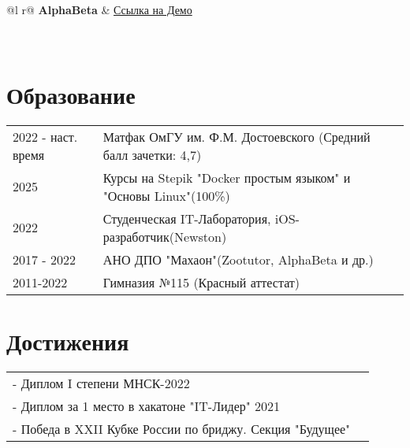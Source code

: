 \documentclass[a4paper,12pt]{article}
\begin{document}
\begin{tabularx}{\linewidth}{ @{}l r@{} }
{\textbf{AlphaBeta}} & \hfill \href{https://github.com/KuznetsLex/AlphaBeta}{Ссылка на Демо} \\[3.75pt]
 \\\\

\end{tabularx}

\section{Образование}
\begin{tabularx}{\linewidth}{@{}l X@{}}	
2022 - наст. время & Матфак ОмГУ им. Ф.М. Достоевского \hfill \normalsize (Средний балл зачетки: 4,7) \\
2025 & Курсы на Stepik "Docker простым языком" и "Основы Linux"\hfill (100\%)\\
2022 & Студенческая IT-Лаборатория, iOS-разработчик\hfill (Newston)\\
2017 - 2022 & АНО ДПО "Махаон"\hfill(Zootutor, AlphaBeta и др.) \\ 
2011-2022 & Гимназия №115 \hfill  (Красный аттестат) \\
\end{tabularx}

\section{Достижения}
\begin{tabularx}{\linewidth}{@{}l X@{}}	
- Диплом I степени МНСК-2022 \hfill \normalsize  \\
- Диплом за 1 место в хакатоне "IT-Лидер" 2021\\
- Победа в XXII Кубке России по бриджу. Секция "Будущее" \hfill  \\
\end{tabularx}
\end{document}
